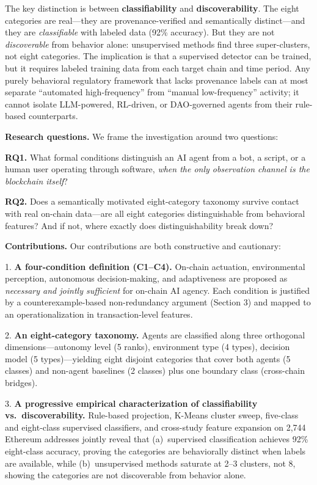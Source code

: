 \documentclass[sigconf,nonacm=false]{acmart}
\begin{document}
The key distinction is between \textbf{classifiability} and \textbf{discoverability}. The eight categories are real---they are provenance-verified and semantically distinct---and they are \emph{classifiable} with labeled data (92\% accuracy). But they are not \emph{discoverable} from behavior alone: unsupervised methods find three super-clusters, not eight categories. The implication is that a supervised detector can be trained, but it requires labeled training data from each target chain and time period. Any purely behavioral regulatory framework that lacks provenance labels can at most separate ``automated high-frequency'' from ``manual low-frequency'' activity; it cannot isolate LLM-powered, RL-driven, or DAO-governed agents from their rule-based counterparts.



\textbf{Research questions.} We frame the investigation around two questions:

\textbf{RQ1.} What formal conditions distinguish an AI agent from a bot, a script, or a human user operating through software, \textit{when the only observation channel is the blockchain itself}?

\textbf{RQ2.} Does a semantically motivated eight-category taxonomy survive contact with real on-chain data---are all eight categories distinguishable from behavioral features? And if not, where exactly does distinguishability break down?

\textbf{Contributions.} Our contributions are both constructive and cautionary:

1. \textbf{A four-condition definition (C1--C4).} On-chain actuation, environmental perception, autonomous decision-making, and adaptiveness are proposed as \textit{necessary and jointly sufficient} for on-chain AI agency. Each condition is justified by a counterexample-based non-redundancy argument (Section 3) and mapped to an operationalization in transaction-level features.

2. \textbf{An eight-category taxonomy.} Agents are classified along three orthogonal dimensions---autonomy level (5 ranks), environment type (4 types), decision model (5 types)---yielding eight disjoint categories that cover both agents (5 classes) and non-agent baselines (2 classes) plus one boundary class (cross-chain bridges).

3. \textbf{A progressive empirical characterization of classifiability vs.\ discoverability.} Rule-based projection, K-Means cluster sweep, five-class and eight-class supervised classifiers, and cross-study feature expansion on 2,744 Ethereum addresses jointly reveal that (a)~supervised classification achieves 92\% eight-class accuracy, proving the categories are behaviorally distinct when labels are available, while (b)~unsupervised methods saturate at 2--3 clusters, not 8, showing the categories are not discoverable from behavior alone.
\end{document}
